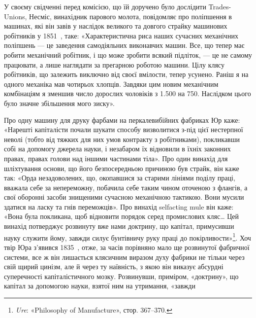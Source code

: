 У своєму свідченні перед комісією, що їй доручено було дослідити
Trades-Unions, Несміс, винахідник парового молота, повідомляє
про поліпшення в машинах, які він завів у наслідок
великого та довгого страйку машинових робітників у 1851~,
таке: «Характеристична риса наших сучасних механічних поліпшень
— це заведення самодіяльних виконавчих машин. Все, що
тепер має робити механічний робітник, і що може зробити всякий
підліток, — це не самому працювати, а лише наглядати за прегарною
роботою машини. Цілу клясу робітників, що залежить
виключно від своєї вмілости, тепер усунено. Раніш я на одного
механіка мав чотирьох хлопців. Завдяки цим новим механічним
комбінаціям я зменшив число дорослих чоловіків з \num{1.500} на 750.
Наслідком цього було значне збільшення мого зиску».

Про одну машину для друку фарбами на перкалевибійних
фабриках Юр каже: «Нарешті капіталісти почали шукати способу
визволитися з-під цієї нестерпної неволі (тобто від тяжких
для них умов контракту з робітниками), покликавши собі на допомогу
джерела науки, і незабаром їх відновили в їхніх законних
правах, правах голови над іншими частинами тіла». Про один
винахід для шліхтування основи, що його безпосередньою причиною
був страйк, він каже так: «Орда незадоволених, що, окопавшися
за старими лініями поділу праці, вважала себе за непереможну,
побачила себе таким чином оточеною з флангів, а свої
оборонні засоби знищеними сучасною механічною тактикою. Вони
мусили здатися на ласку та гнів переможців». Про винахід
selfacting mule він каже: «Вона була покликана, щоб відновити
порядок серед промислових кляс\dots{} Цей винахід потверджує
розвинуту вже нами доктрину, що капітал, примусивши науку
служити йому, завжди силує бунтівничу руку праці до покірливости»\footnote{
\emph{Ure}: «Philosophy of Manufacture», стор. 367--370.
}. Хоч твір Юра з’явився 1835~, отже, за часів порівняно
мало ще розвинутої фабричної системи, все ж він лишається клясичним
виразом духу фабрики не тільки через свій щирий цинізм,
але й через ту наївність, з якою він виказує абсурдні суперечності
капіталістичного мозку. Розвинувши, приміром, «доктрину»,
що капітал за допомогою науки, взятої ним на утримання, «завжди
\parbreak{}  %
